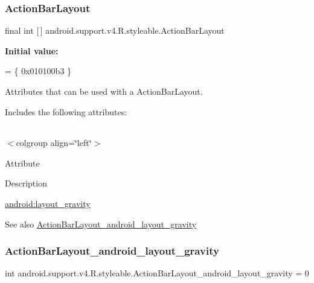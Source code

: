 \subsubsection{\texorpdfstring{Action\+Bar\+Layout}{ActionBarLayout}}
{\footnotesize\ttfamily final int \mbox{[}$\,$\mbox{]} android.\+support.\+v4.\+R.\+styleable.\+Action\+Bar\+Layout\hspace{0.3cm}{\ttfamily [static]}}

{\bfseries Initial value\+:}
\begin{DoxyCode}
= \{
            0x010100b3
        \}
\end{DoxyCode}
Attributes that can be used with a Action\+Bar\+Layout. 

Includes the following attributes\+:

\tabulinesep=1mm
\begin{longtabu} spread 0pt [c]{*{0}{|X[-1]}|}
\hline
\end{longtabu}
$<$colgroup align=\char`\"{}left\char`\"{}$>$ 

Attribute

Description 

{\ttfamily \hyperlink{classandroid_1_1support_1_1v4_1_1R_1_1styleable_ac0ed4159880f534b9928b89eb5dd5eaa}{android\+:layout\+\_\+gravity}}

\begin{DoxySeeAlso}{See also}
\hyperlink{classandroid_1_1support_1_1v4_1_1R_1_1styleable_ac0ed4159880f534b9928b89eb5dd5eaa}{Action\+Bar\+Layout\+\_\+android\+\_\+layout\+\_\+gravity} 
\end{DoxySeeAlso}
\mbox{\label{classandroid_1_1support_1_1v4_1_1R_1_1styleable_ac0ed4159880f534b9928b89eb5dd5eaa}} 
\subsubsection{\texorpdfstring{Action\+Bar\+Layout\+\_\+android\+\_\+layout\+\_\+gravity}{ActionBarLayout\_android\_layout\_gravity}}
{\footnotesize\ttfamily int android.\+support.\+v4.\+R.\+styleable.\+Action\+Bar\+Layout\+\_\+android\+\_\+layout\+\_\+gravity = 0\hspace{0.3cm}{\ttfamily [static]}}

